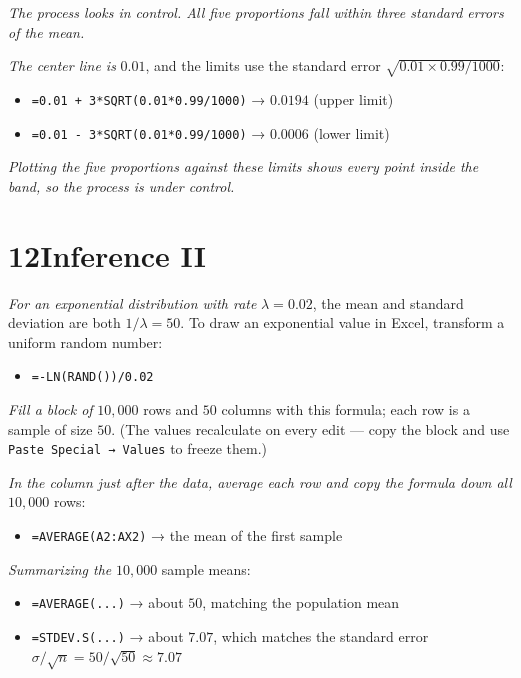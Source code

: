 \documentclass[
  11pt,
  letterpaper,
  DIV=11,
  numbers=noendperiod,
  oneside,
  open=any]{scrreprt}
\providecommand{\tightlist}{%
  \setlength{\itemsep}{0pt}\setlength{\parskip}{0pt}}\usepackage{longtable,booktabs,array}
\newcommand{\bsanswerchapter}[2]{%
  \section*{\textcolor{bsaccent}{#1}\hspace{0.6em}#2}%
  \addcontentsline{toc}{section}{#1\hspace{0.6em}#2}}
\newenvironment{bsanswerkey}[2]{%
  \begin{tcolorbox}[bsbase, colback=bspaper2, colframe=bsline, fontupper=\small,
    title={\hypertarget{a-#1}{}\label{a-#1}\hyperlink{q-#1}{\textcolor{bsink2}{\MakeUppercase{#2}}}\hfill
      \hyperlink{q-#1}{\textcolor{bsaccent}{\normalfont\footnotesize back to page \pageref{q-#1}}}}]}%
  {\end{tcolorbox}}
\begin{document}
\begin{bsanswerkey}{bsans112}{Exercise 4, question 2}

\emph{The process looks in control. All five proportions fall within
three standard errors of the mean.}

\emph{The center line is} \(0.01\), and the limits use the standard
error \(\sqrt{0.01 \times 0.99 / 1000}\):

\begin{itemize}
\tightlist
\item
  \texttt{=0.01\ +\ 3*SQRT(0.01*0.99/1000)} → \(0.0194\) (upper limit)
\item
  \texttt{=0.01\ -\ 3*SQRT(0.01*0.99/1000)} → \(0.0006\) (lower limit)
\end{itemize}

\emph{Plotting the five proportions against these limits shows every
point inside the band, so the process is under control.}

\end{bsanswerkey}

\bsanswerchapter{12}{Inference II}

\begin{bsanswerkey}{bsans113}{Exercise 1, question 1}

\emph{For an exponential distribution with rate} \(\lambda = 0.02\), the
mean and standard deviation are both \(1/\lambda = 50\). To draw an
exponential value in Excel, transform a uniform random number:

\begin{itemize}
\tightlist
\item
  \texttt{=-LN(RAND())/0.02}
\end{itemize}

\emph{Fill a block of} \(10{,}000\) rows and \(50\) columns with this
formula; each row is a sample of size \(50\). (The values recalculate on
every edit --- copy the block and use \texttt{Paste\ Special\ →\ Values}
to freeze them.)

\end{bsanswerkey}

\begin{bsanswerkey}{bsans114}{Exercise 1, question 2}

\emph{In the column just after the data, average each row and copy the
formula down all} \(10{,}000\) rows:

\begin{itemize}
\tightlist
\item
  \texttt{=AVERAGE(A2:AX2)} → the mean of the first sample
\end{itemize}

\emph{Summarizing the} \(10{,}000\) sample means:

\begin{itemize}
\tightlist
\item
  \texttt{=AVERAGE(...)} → about \(50\), matching the population mean
\item
  \texttt{=STDEV.S(...)} → about \(7.07\), which matches the standard
  error \(\sigma/\sqrt{n} = 50/\sqrt{50} \approx 7.07\)
\end{itemize}

\end{bsanswerkey}
\end{document}
